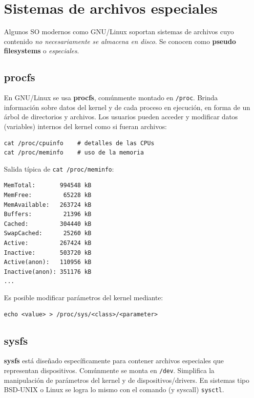 \documentclass[11pt,a4paper]{article}
\begin{document}
\section{Sistemas de archivos especiales}

Algunos SO modernos como GNU/Linux soportan sistemas de archivos cuyo
contenido \emph{no necesariamente se almacena en disco}. Se conocen
como \textbf{pseudo filesystems} o \emph{especiales}.

\subsection{procfs}

En GNU/Linux se usa \textbf{procfs}, comúnmente montado en
\verb|/proc|. Brinda información sobre datos del kernel y de cada
proceso en ejecución, en forma de un árbol de directorios y archivos.
Los usuarios pueden acceder y modificar datos (variables) internos del
kernel como si fueran archivos:

\begin{lstlisting}[style=shellstyle]
cat /proc/cpuinfo    # detalles de las CPUs
cat /proc/meminfo    # uso de la memoria
\end{lstlisting}

Salida típica de \verb|cat /proc/meminfo|:

\begin{lstlisting}[style=textstyle]
MemTotal:       994548 kB
MemFree:         65228 kB
MemAvailable:   263724 kB
Buffers:         21396 kB
Cached:         304440 kB
SwapCached:      25260 kB
Active:         267424 kB
Inactive:       503720 kB
Active(anon):   110956 kB
Inactive(anon): 351176 kB
...
\end{lstlisting}

Es posible modificar parámetros del kernel mediante:

\begin{lstlisting}[style=shellstyle]
echo <value> > /proc/sys/<class>/<parameter>
\end{lstlisting}

\subsection{sysfs}

\textbf{sysfs} está diseñado específicamente para contener archivos
especiales que representan dispositivos. Comúnmente se monta en
\verb|/dev|. Simplifica la manipulación de parámetros del kernel y de
dispositivos/drivers. En sistemas tipo BSD-UNIX o Linux se logra lo
mismo con el comando (y syscall) \texttt{sysctl}.
\end{document}
